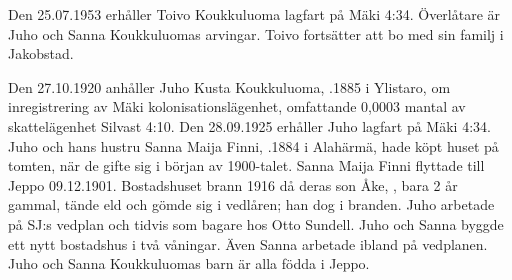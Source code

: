 %
Den 25.07.1953 erhåller Toivo Koukkuluoma lagfart på Mäki 4:34.	Överlåtare är Juho och Sanna Koukkuluomas arvingar. Toivo fortsätter att bo med sin familj i Jakobstad.


%
Den 27.10.1920 anhåller Juho Kusta Koukkuluoma, .1885 i Ylistaro, om inregistrering av Mäki kolonisationslägenhet, omfattande 0,0003 mantal av skattelägenhet Silvast 4:10. Den 28.09.1925 erhåller Juho lagfart på Mäki 4:34. Juho och hans hustru Sanna Maija Finni, .1884 i Alahärmä, hade köpt huset på tomten, när de gifte sig i början av 1900-talet. Sanna Maija Finni flyttade till Jeppo 09.12.1901.	Bostadshuset brann 1916 då deras son Åke, , bara 2 år gammal, tände eld och 	gömde sig i vedlåren; han dog i branden. Juho arbetade på SJ:s vedplan och tidvis som bagare hos Otto Sundell. Juho och Sanna byggde	ett nytt bostadshus i två våningar. Även Sanna arbetade ibland på 	vedplanen. Juho och Sanna Koukkuluomas barn är alla födda i Jeppo.
\begin{jhchildren}
  \item {}
  \item {}
  \item {}
  \item {}
  \item {}
  \item {}
  \item {}
  \item {}
  \item {}
  \item {}
\end{jhchildren}


